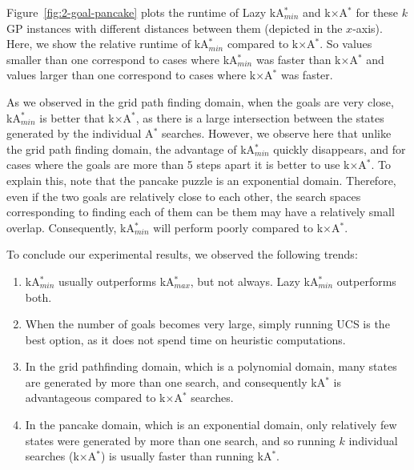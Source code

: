 \documentclass{aicom2e}
\newcommand{\kgs}{$k$GP}
\newcommand{\astar}{A$^*$}
\newcommand{\kastar}{kA$^*$}
\newcommand{\kastarmin}{kA$^*_{min}$}
\newcommand{\kastarmax}{kA$^*_{max}$}
\newcommand{\kxastar}{k$\times$A$^*$}
\begin{document}
Figure~\ref{fig:2-goal-pancake} plots the runtime of Lazy \kastarmin{} and \kxastar{} for these \kgs{} instances with different distances between them (depicted in the $x$-axis). Here, we show the relative runtime of \kastarmin{} compared to \kxastar{}. So values smaller than one correspond to cases where \kastarmin{} was faster than \kxastar{} and values larger than one correspond to cases where \kxastar{} was faster. 

As we observed in the grid path finding domain, when the goals are very close, \kastarmin{} is better that \kxastar{}, as there is a large intersection between the states generated by the individual \astar{} searches. However, we observe here that unlike the grid path finding domain, the advantage of \kastarmin{} quickly disappears, and for cases where the goals are more than 5 steps apart it is better to use \kxastar{}. To explain this, note that the pancake puzzle is an exponential domain. Therefore, even if the two goals are relatively close to each other, the search spaces corresponding to finding each of them can be them 
may have a relatively small overlap. Consequently, \kastarmin{} will perform poorly compared to \kxastar{}. 




To conclude our experimental results, we observed the following trends:
\begin{enumerate}
    \item \kastarmin{} usually outperforms \kastarmax{}, but not always. Lazy \kastarmin{} outperforms both.
    \item When the number of goals becomes very large, simply running UCS is the best option, as it does not spend time on heuristic computations.
    \item In the grid pathfinding domain, which is a polynomial domain, many states are generated by more than one search, and consequently \kastar{} is advantageous compared to \kxastar{} searches.
    \item In the pancake domain, which is an exponential domain, 
    only relatively few states were generated by more than one search,
    and so running $k$ individual searches (\kxastar{}) is usually faster than running \kastar{}.  
\end{enumerate}
\end{document}
